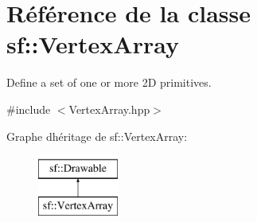 \hypertarget{classsf_1_1VertexArray}{}\section{Référence de la classe sf\+:\+:Vertex\+Array}
\label{classsf_1_1VertexArray}


Define a set of one or more 2D primitives.  




{\ttfamily \#include $<$Vertex\+Array.\+hpp$>$}

Graphe d\textquotesingle{}héritage de sf\+:\+:Vertex\+Array\+:\begin{figure}[H]
\begin{center}
\leavevmode
\includegraphics[height=2.000000cm]{classsf_1_1VertexArray}
\end{center}
\end{figure}

